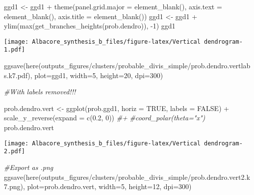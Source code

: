 \documentclass[
]{article}
\newenvironment{Shaded}{\begin{snugshade}}{\end{snugshade}}
\newcommand{\AttributeTok}[1]{\textcolor[rgb]{0.77,0.63,0.00}{#1}}
\newcommand{\CommentTok}[1]{\textcolor[rgb]{0.56,0.35,0.01}{\textit{#1}}}
\newcommand{\ConstantTok}[1]{\textcolor[rgb]{0.00,0.00,0.00}{#1}}
\newcommand{\DecValTok}[1]{\textcolor[rgb]{0.00,0.00,0.81}{#1}}
\newcommand{\FloatTok}[1]{\textcolor[rgb]{0.00,0.00,0.81}{#1}}
\newcommand{\FunctionTok}[1]{\textcolor[rgb]{0.00,0.00,0.00}{#1}}
\newcommand{\NormalTok}[1]{#1}
\newcommand{\OtherTok}[1]{\textcolor[rgb]{0.56,0.35,0.01}{#1}}
\newcommand{\SpecialCharTok}[1]{\textcolor[rgb]{0.00,0.00,0.00}{#1}}
\newcommand{\StringTok}[1]{\textcolor[rgb]{0.31,0.60,0.02}{#1}}
\begin{document}
\begin{Shaded}
\begin{Highlighting}[]
\NormalTok{ggd1 }\OtherTok{\textless{}{-}}\NormalTok{ ggd1 }\SpecialCharTok{+} \FunctionTok{theme}\NormalTok{(}\AttributeTok{panel.grid.major =} \FunctionTok{element\_blank}\NormalTok{(),}
                     \AttributeTok{axis.text =} \FunctionTok{element\_blank}\NormalTok{(),}
                     \AttributeTok{axis.title =} \FunctionTok{element\_blank}\NormalTok{())}
\NormalTok{ggd1 }\OtherTok{\textless{}{-}}\NormalTok{ ggd1 }\SpecialCharTok{+} \FunctionTok{ylim}\NormalTok{(}\FunctionTok{max}\NormalTok{(}\FunctionTok{get\_branches\_heights}\NormalTok{(prob.dendro)), }\SpecialCharTok{{-}}\DecValTok{1}\NormalTok{)}
\NormalTok{ggd1}
\end{Highlighting}
\end{Shaded}

\texttt{[image: Albacore\_synthesis\_b\_files/figure-latex/Vertical dendrogram-1.pdf]}

\begin{Shaded}
\begin{Highlighting}[]
\FunctionTok{ggsave}\NormalTok{(}\FunctionTok{here}\NormalTok{(}\StringTok{\textquotesingle{}outputs\_figures/clusters/probable\_divis\_simple/prob.dendro.vertlabs.k7.pdf\textquotesingle{}}\NormalTok{), }\AttributeTok{plot=}\NormalTok{ggd1, }\AttributeTok{width=}\DecValTok{5}\NormalTok{, }\AttributeTok{height=}\DecValTok{20}\NormalTok{, }\AttributeTok{dpi=}\DecValTok{300}\NormalTok{)}

\CommentTok{\#With labels removed!!!}

\NormalTok{prob.dendro.vert }\OtherTok{\textless{}{-}} \FunctionTok{ggplot}\NormalTok{(prob.ggd1, }\AttributeTok{horiz =} \ConstantTok{TRUE}\NormalTok{, }\AttributeTok{labels =} \ConstantTok{FALSE}\NormalTok{) }\SpecialCharTok{+} 
  \FunctionTok{scale\_y\_reverse}\NormalTok{(}\AttributeTok{expand =} \FunctionTok{c}\NormalTok{(}\FloatTok{0.2}\NormalTok{, }\DecValTok{0}\NormalTok{)) }\CommentTok{\#+}
\CommentTok{\#coord\_polar(theta="x")}
\NormalTok{prob.dendro.vert }
\end{Highlighting}
\end{Shaded}

\texttt{[image: Albacore\_synthesis\_b\_files/figure-latex/Vertical dendrogram-2.pdf]}

\begin{Shaded}
\begin{Highlighting}[]
\CommentTok{\#Export as .png}
\FunctionTok{ggsave}\NormalTok{(}\FunctionTok{here}\NormalTok{(}\StringTok{\textquotesingle{}outputs\_figures/clusters/probable\_divis\_simple/prob.dendro.vert2.k7.png\textquotesingle{}}\NormalTok{), }\AttributeTok{plot=}\NormalTok{prob.dendro.vert, }\AttributeTok{width=}\DecValTok{5}\NormalTok{, }\AttributeTok{height=}\DecValTok{12}\NormalTok{, }\AttributeTok{dpi=}\DecValTok{300}\NormalTok{)}
\end{Highlighting}
\end{Shaded}
\end{document}
